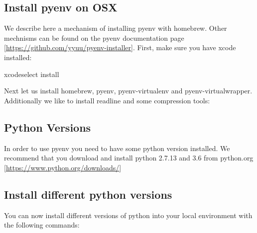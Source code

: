 \subsection{Install pyenv on OSX}
\label{\detokenize{lesson/prg/pyenv:install-pyenv-on-osx}}
We describe here a mechanism of installing pyenv with homebrew. Other
mechnisms can be found on the pyenv documentation page
{[}\url{https://github.com/yyuu/pyenv-installer}{]}. First, make sure you have
xcode installed:

\begin{sphinxVerbatim}[commandchars=\\\{\}]
\PYGZdl{} xcode\PYGZhy{}select \PYGZhy{}\PYGZhy{}install
\end{sphinxVerbatim}

Next let us install homebrew, pyenv, pyenv-virtualenv and
pyenv-virtualwrapper. Additionally we like to install readline and
some compression tools:

\begin{sphinxVerbatim}[commandchars=\\\{\}]
  
 
    
   
\end{sphinxVerbatim}


\subsection{Python Versions}
\label{\detokenize{lesson/prg/pyenv:python-versions}}
In order to use pyenv you need to have some python version
installed. We recommend that you download and install python 2.7.13
and 3.6 from python.org {[}\url{https://www.python.org/downloads/}{]}


\subsection{Install different python versions}
\label{\detokenize{lesson/prg/pyenv:install-different-python-versions}}
You can now install different versions of python into your local
environment with the following commands:

